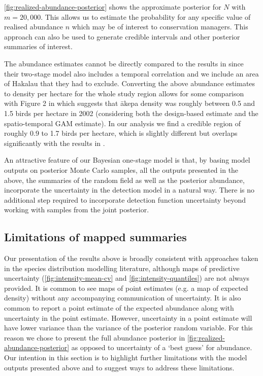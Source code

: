 \documentclass{stylefile16/statsoc}
\newcommand{\akepa}{\textquotesingle\={a}kepa}  %
\begin{document}
\autoref{fig:realized-abundance-posterior} shows the approximate posterior for $N$ with $m = 20,000$.  This allows us to estimate the probability for any specific value of realised abundance $n$ which may be of interest to conservation managers.  This approach can also be used to generate credible intervals and other posterior summaries of interest. 

The abundance estimates cannot be directly compared to the results in \cite{camp_dsm_2020} since their two-stage model also includes a temporal correlation and we include an area of Hakalau that they had to exclude.  Converting the above abundance estimates to density per hectare for the whole study region allows for some comparison with Figure 2 in \cite{camp_dsm_2020} which suggests that \akepa{} density was roughly between 0.5 and 1.5 birds per hectare in 2002 (considering both the design-based estimate and the spatio-temporal GAM estimate).  In our analysis we find a credible region of roughly 0.9 to 1.7 birds per hectare, which is slightly different but overlaps significantly with the results in \cite{camp_dsm_2020}.

An attractive feature of our Bayesian one-stage model is that, by basing model outputs on posterior Monte Carlo samples, all the outputs presented in the above, the summaries of the random field as well as the posterior abundance, incorporate the uncertainty in the detection model in a natural way.  There is no additional step required to incorporate detection function uncertainty beyond working with samples from the joint posterior.

\subsection{Limitations of mapped summaries}

Our presentation of the results above is broadly consistent with approaches taken in the species distribution modelling literature, although maps of predictive uncertainty (\autoref{fig:intensity-mean-cv} and \autoref{fig:intensity-quantiles}) are not always provided.  It is common to see maps of point estimates (e.g. a map of expected density) without any accompanying communication of uncertainty.  It is also common to report a point estimate of the expected abundance along with uncertainty in the point estimate.  However, uncertainty in a point estimate will have lower variance than the variance of the posterior random variable.  For this reason we chose to present the full abundance posterior in \autoref{fig:realized-abundance-posterior} as opposed to uncertainty of a `best guess' for abundance.  Our intention in this section is to highlight further limitations with the model outputs presented above and to suggest ways to address these limitations. 
\end{document}

